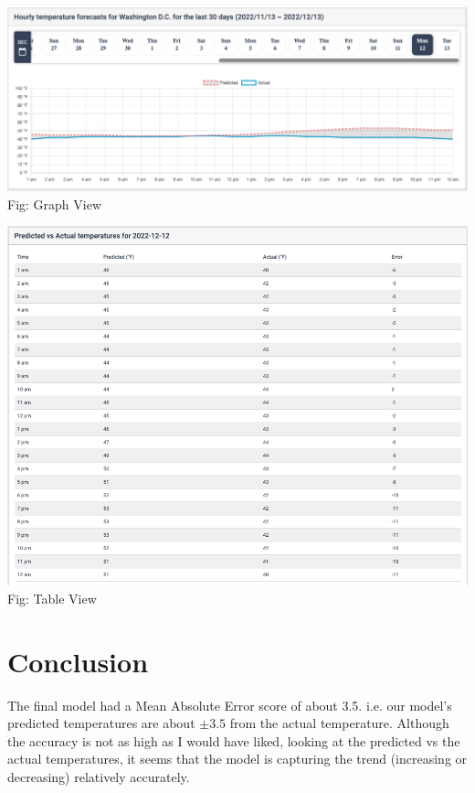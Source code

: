 \documentclass[paper=a4, fontsize=11pt, margin=1in]{scrartcl}
\numberwithin{equation}{section}		%
\numberwithin{figure}{section}			%
\numberwithin{table}{section}				%
\begin{document}
\begin{center}
    \includegraphics[width=1\textwidth]{graph-view.png}\\
    Fig: Graph View
\end{center}

\begin{center}
    \includegraphics[width=1\textwidth,height=0.3\textheight]{table-view.png}\\
    Fig: Table View
\end{center}

\section{\textbf{Conclusion}}
The final model had a Mean Absolute Error score of about 3.5. i.e. our model's predicted temperatures are about $\pm3.5$ from the actual temperature. Although the accuracy is not as high as I would have liked, looking at the predicted vs the actual temperatures, it seems that the model is capturing the trend (increasing or decreasing) relatively accurately. \\
\end{document}
